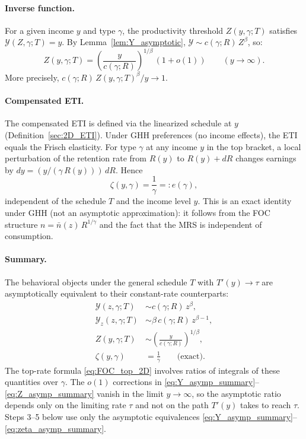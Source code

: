 \documentclass[12pt,a4paper]{article}
\theoremstyle{definition}
\theoremstyle{plain}
\theoremstyle{remark}
\newcommand{\calY}{\mathcal{Y}}
\begin{document}
\paragraph{Inverse function.}
For a given income $y$ and type $\gamma$, the productivity threshold $Z(y,\gamma;T)$ satisfies $\calY(Z,\gamma;T) = y$.  By Lemma~\ref{lem:Y_asymptotic}, $\calY \sim c(\gamma;R)\,Z^{\beta}$, so:
\begin{equation}
\label{eq:Z_inverse_top_2D}
  Z(y,\gamma;T) = \left(\frac{y}{c(\gamma;R)}\right)^{1/\beta}\,(1 + o(1)) \qquad (y \to \infty).
\end{equation}
More precisely, $c(\gamma;R)\,Z(y,\gamma;T)^{\beta}/y \to 1$.

\paragraph{Compensated ETI.}
The compensated ETI is defined via the linearized schedule at $y$ (Definition~\ref{sec:2D_ETI}).  Under GHH preferences (no income effects), the ETI equals the Frisch elasticity.  For type $\gamma$ at any income $y$ in the top bracket, a local perturbation of the retention rate from $R(y)$ to $R(y) + dR$ changes earnings by $dy = (y/(\gamma\,R(y)))\,dR$.  Hence
\begin{equation}
\label{eq:zeta_top_2D}
  \zeta(y,\gamma) = \frac{1}{\gamma} =: e(\gamma),
\end{equation}
independent of the schedule $T$ and the income level $y$.  This is an exact identity under GHH (not an asymptotic approximation): it follows from the FOC structure $n = \bar{n}(z)\,R^{1/\gamma}$ and the fact that the MRS is independent of consumption.

\paragraph{Summary.}
The behavioral objects under the general schedule $T$ with $T'(y) \to \tau$ are asymptotically equivalent to their constant-rate counterparts:
\begin{align}
  \calY(z,\gamma;T) &\sim c(\gamma;R)\,z^{\beta}, \label{eq:Y_asymp_summary} \\
  \calY_z(z,\gamma;T) &\sim \beta\,c(\gamma;R)\,z^{\beta-1}, \label{eq:Yz_asymp_summary} \\
  Z(y,\gamma;T) &\sim \left(\frac{y}{c(\gamma;R)}\right)^{1/\beta}, \label{eq:Z_asymp_summary} \\
  \zeta(y,\gamma) &= \frac{1}{\gamma} \qquad \text{(exact)}. \label{eq:zeta_asymp_summary}
\end{align}
The top-rate formula \eqref{eq:FOC_top_2D} involves ratios of integrals of these quantities over $\gamma$.  The $o(1)$ corrections in \eqref{eq:Y_asymp_summary}--\eqref{eq:Z_asymp_summary} vanish in the limit $y \to \infty$, so the asymptotic ratio depends only on the limiting rate $\tau$ and not on the path $T'(y)$ takes to reach $\tau$.  Steps 3--5 below use only the asymptotic equivalences \eqref{eq:Y_asymp_summary}--\eqref{eq:zeta_asymp_summary}.
\end{document}
